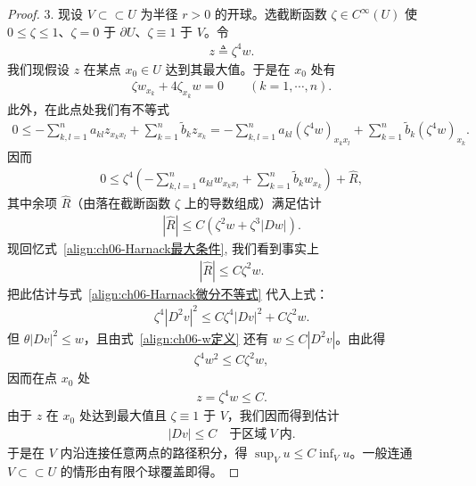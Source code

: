 \documentclass[../../main.tex]{subfiles}
\begin{document}
\begin{proof}
3. 现设 $V\subset \subset U$ 为半径 $r>0$ 的开球。选截断函数 $\zeta\in C^{\infty}(U)$ 使 $0\leqslant\zeta\leqslant 1$、$\zeta=0$ 于 $\partial U$、$\zeta\equiv 1$ 于 $V$。令
\begin{align}
z\triangleq\zeta^{4}w.
\end{align}
我们现假设 $z$ 在某点 $x_{0}\in U$ 达到其最大值。于是在 $x_{0}$ 处有
\begin{align}
\zeta w_{x_{k}}+4\zeta_{x_{k}}w=0\qquad (k=1,\cdots,n).
\end{align}
此外，在此点处我们有不等式
\begin{align*}
0\leqslant-\sum_{k,l=1}^{n}a_{kl}z_{x_{k}x_{l}}+\sum_{k=1}^{n}\widetilde{b}_{k}z_{x_{k}}
=-\sum_{k,l=1}^{n}a_{kl}(\zeta^{4}w)_{x_{k}x_{l}}+\sum_{k=1}^{n}\widetilde{b}_{k}(\zeta^{4}w)_{x_{k}}.
\end{align*}
因而
\begin{align}
0\leqslant\zeta^{4}\left(-\sum_{k,l=1}^{n}a_{kl}w_{x_{k}x_{l}}+\sum_{k=1}^{n}\widetilde{b}_{k}w_{x_{k}}\right)+\widehat{R},
\end{align}
其中余项 $\widehat{R}$（由落在截断函数 $\zeta$ 上的导数组成）满足估计
\begin{align*}
|\widehat{R}|\leqslant C(\zeta^{2}w+\zeta^{3}|Dw|).
\end{align*}
现回忆式~\eqref{align:ch06-Harnack最大条件}, 我们看到事实上
\begin{align}
|\widehat{R}|\leqslant C\zeta^{2}w.
\end{align}
把此估计与式~\eqref{align:ch06-Harnack微分不等式} 代入上式：
\begin{align*}
\zeta^{4}|D^{2}v|^{2}\leqslant C\zeta^{4}|Dv|^{2}+C\zeta^{2}w.
\end{align*}
但 $\theta|Dv|^{2}\leqslant w$，且由式~\eqref{align:ch06-w定义} 还有 $w\leqslant C|D^{2}v|$。由此得
\begin{align*}
\zeta^{4}w^{2}\leqslant C\zeta^{2}w,
\end{align*}
因而在点 $x_{0}$ 处
\begin{align*}
z=\zeta^{4}w\leqslant C.
\end{align*}
由于 $z$ 在 $x_{0}$ 处达到最大值且 $\zeta\equiv 1$ 于 $V$，我们因而得到估计
\begin{align}
|Dv|\leqslant C\quad\text{于区域}\ V\ \text{内}.
\end{align}
于是在 $V$ 内沿连接任意两点的路径积分，得 $\sup_{V}u\leqslant C\inf_{V}u$。一般连通 $V\subset \subset U$ 的情形由有限个球覆盖即得。
\end{proof}
\end{document}
